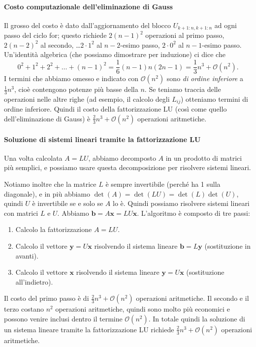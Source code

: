 \documentclass[a4paper]{report}
\theoremstyle{definition}
\theoremstyle{remark}
\newcommand{\x}{\mathbf{x}}
\renewcommand{\b}{\mathbf{b}}
\begin{document}
\paragraph{Costo computazionale dell'eliminazione di Gauss}

Il grosso del costo è dato dall'aggiornamento del blocco $U_{k+1:n, k+1:n}$ ad ogni passo del ciclo for; questo richiede $2(n-1)^2$ operazioni al primo passo, $2(n-2)^2$ al secondo, \dots $2\cdot 1^2$ al $n-2$-esimo passo, $2\cdot 0^2$ al $n-1$-esimo passo. Un'identità algebrica (che possiamo dimostrare per induzione) ci dice che
\[
0^2+1^2 + 2^2 + \dots + (n-1)^2 = \frac{1}{6}(n-1)n(2n-1) = \frac13n^3 + \mathcal{O}(n^2).
\]
I termini che abbiamo omesso e indicato con $\mathcal{O}(n^2)$ sono \emph{di ordine inferiore} a $\frac13 n^3$, cioè contengono potenze più basse della $n$. Se teniamo traccia delle operazioni nelle altre righe (ad esempio, il calcolo degli $L_{ij}$) otteniamo termini di ordine inferiore. Quindi il costo della fattorizzazione LU (così come quello dell'eliminazione di Gauss) è $\frac23 n^3 + \mathcal{O}(n^2)$ operazioni aritmetiche.

\paragraph{Soluzione di sistemi lineari tramite la fattorizzazione LU} 
Una volta calcolata $A = LU$, abbiamo decomposto $A$ in un prodotto di matrici più semplici, e possiamo usare questa decomposizione per risolvere sistemi lineari. 


Notiamo inoltre che la matrice $L$ è sempre invertibile (perché ha 1 sulla diagonale), e in più abbiamo $\det(A) = \det(LU) = \det(L) \det(U)$, quindi $U$ è invertibile se e solo se $A$ lo è. Quindi possiamo risolvere sistemi lineari con matrici $L$ e $U$. Abbiamo $\b = A\x = LU\x$.
L'algoritmo è composto di tre passi:
\begin{enumerate}
    \item Calcolo la fattorizzazione $A=LU$.
    \item Calcolo il vettore $\mathbf{y}=U\x$ risolvendo il sistema lineare $\b=L\mathbf{y}$ (sostituzione in avanti).
    \item Calcolo il vettore $\x$ risolvendo il sistema lineare $\mathbf{y}=U\x$ (sostituzione all'indietro).
\end{enumerate}
Il costo del primo passo è di $\frac23 n^3 + \mathcal{O}(n^2)$ operazioni aritmetiche. Il secondo e il terzo costano $n^2$ operazioni aritmetiche, quindi sono molto più economici e possono venire inclusi dentro il termine $\mathcal{O}(n^2)$. In totale quindi la soluzione di un sistema lineare tramite la fattorizzazione LU richiede $\frac23 n^3 + \mathcal{O}(n^2)$ operazioni aritmetiche.
\end{document}
